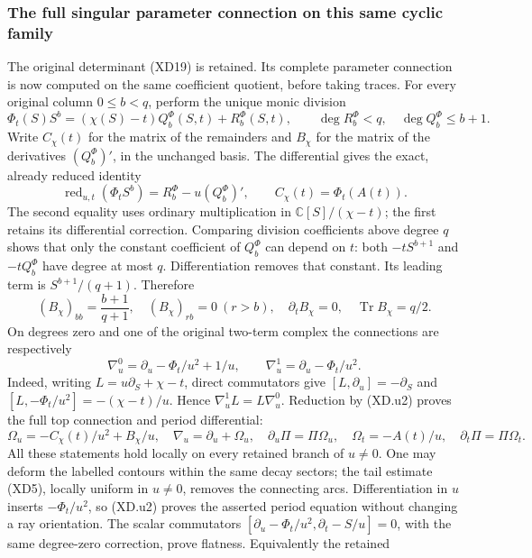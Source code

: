 
\subsubsection{The full singular parameter connection on this same cyclic family}

The original determinant (XD19) is retained.  Its complete parameter
connection is now computed on the same coefficient quotient, before
taking traces.  For every original column $0\le b<q$, perform the
unique monic division
\[
 \Phi_t(S)S^b=(\chi(S)-t)Q_b^\Phi(S,t)+R_b^\Phi(S,t),
 \qquad \deg R_b^\Phi<q,\quad\deg Q_b^\Phi\le b+1.
 \tag{XD.u1}
\]
Write $C_\chi(t)$ for the matrix of the remainders and $B_\chi$ for
the matrix of the derivatives $(Q_b^\Phi)'$, in the unchanged basis.
The differential gives the exact, already reduced identity
\[
 \operatorname{red}_{u,t}(\Phi_t S^b)=R_b^\Phi-u(Q_b^\Phi)',\qquad
 C_\chi(t)=\Phi_t(A(t)).                              \tag{XD.u2}
\]
The second equality uses ordinary multiplication in $\mathbb C[S]/(\chi-t)$;
the first retains its differential correction.  Comparing division
coefficients above degree $q$ shows that only the constant coefficient
of $Q_b^\Phi$ can depend on $t$: both $-tS^{b+1}$ and $-tQ_b^\Phi$
have degree at most $q$.  Differentiation removes that constant.
Its leading term is $S^{b+1}/(q+1)$.  Therefore
\[
 (B_\chi)_{bb}=\frac{b+1}{q+1},\quad
 (B_\chi)_{rb}=0\ (r>b),\quad
 \partial_t B_\chi=0,\quad \operatorname{Tr}B_\chi=q/2.
 \tag{XD.u3}
\]
On degrees zero and one of the original two-term complex the connections
are respectively
\[
 \nabla_u^0=\partial_u-\Phi_t/u^2+1/u,\qquad
 \nabla_u^1=\partial_u-\Phi_t/u^2.                    \tag{XD.u4}
\]
Indeed, writing $L=u\partial_S+\chi-t$, direct commutators give
$[L,\partial_u]=-\partial_S$ and
$[L,-\Phi_t/u^2]=-(\chi-t)/u$.  Hence
$\nabla_u^1L=L\nabla_u^0$.  Reduction by (XD.u2) proves the full
top connection and period differential:
\[
 \Omega_u=-C_\chi(t)/u^2+B_\chi/u,
 \quad\nabla_u=\partial_u+\Omega_u,
 \quad \partial_u\Pi=\Pi\Omega_u,
 \quad\Omega_t=-A(t)/u,\quad\partial_t\Pi=\Pi\Omega_t.
 \tag{XD.u5}
\]
All these statements hold locally on every retained branch of $u\ne0$.
One may deform the labelled contours within the same decay sectors;
the tail estimate (XD5), locally uniform in $u\ne0$, removes the
connecting arcs.  Differentiation in $u$ inserts $-\Phi_t/u^2$,
so (XD.u2) proves the asserted period equation without changing a ray
orientation.  The scalar commutators
$[\partial_u-\Phi_t/u^2,\partial_t-S/u]=0$, with the same
degree-zero correction, prove flatness.  Equivalently the retained
